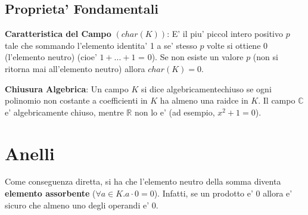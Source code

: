 \subsection{Proprieta' Fondamentali}
\textbf{Caratteristica del Campo} $ (char(K)) $: E' il piu' piccol intero positivo $ p $ tale che sommando l'elemento identita' 1 a se' stesso $ p $ volte si ottiene 0 (l'elemento neutro) (cioe' $ 1 + ... + 1 $ = 0). Se non esiste un valore $ p $ (non si ritorna mai all'elemento neutro) allora $ char(K) = 0 $.

\textbf{Chiusura Algebrica}: Un campo $ K $ si dice algebricamentechiuso se ogni polinomio non costante a coefficienti in $ K $ ha almeno una raidce in $ K $. Il campo $ \mathbb{C} $ e' algebricamente chiuso, mentre $ \mathbb{R} $ non lo e' (ad esempio, $ x^2 + 1 = 0 $).

\section{Anelli}

Come conseguenza diretta, si ha che l'elemento neutro della somma diventa \textbf{elemento assorbente} ($ \forall a \in K. a \cdot 0 = 0 $). Infatti, se un prodotto e' 0 allora e' sicuro che almeno uno degli operandi e' 0.


